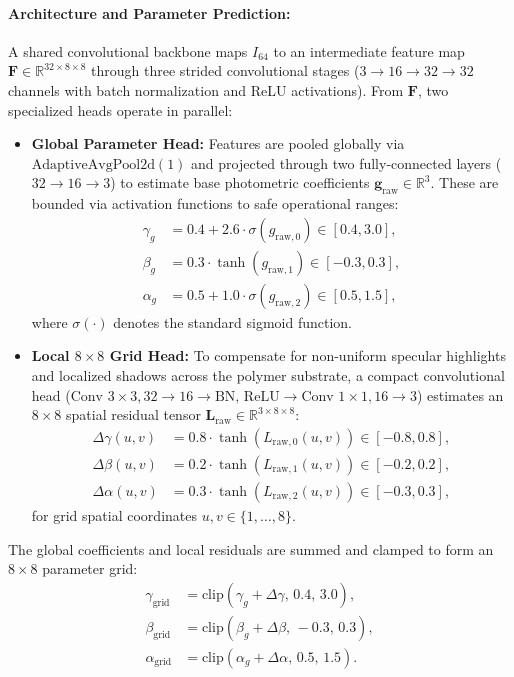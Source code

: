 \documentclass[final,5p,times,twocolumn,authoryear]{elsarticle}
\begin{document}
\paragraph{Architecture and Parameter Prediction:}
A shared convolutional backbone maps $I_{64}$ to an intermediate feature map $\mathbf{F} \in \mathbb{R}^{32 \times 8 \times 8}$ through three strided convolutional stages ($3 \to 16 \to 32 \to 32$ channels with batch normalization and ReLU activations). From $\mathbf{F}$, two specialized heads operate in parallel:
\begin{itemize}
    \item \textbf{Global Parameter Head:} Features are pooled globally via $\text{AdaptiveAvgPool2d}(1)$ and projected through two fully-connected layers ($32 \to 16 \to 3$) to estimate base photometric coefficients $\mathbf{g}_{\text{raw}} \in \mathbb{R}^3$. These are bounded via activation functions to safe operational ranges:
    \begin{align}
    \gamma_g &= 0.4 + 2.6 \cdot \sigma(g_{\text{raw}, 0}) \in [0.4, 3.0], \\
    \beta_g  &= 0.3 \cdot \tanh(g_{\text{raw}, 1}) \in [-0.3, 0.3], \\
    \alpha_g &= 0.5 + 1.0 \cdot \sigma(g_{\text{raw}, 2}) \in [0.5, 1.5],
    \end{align}
    where $\sigma(\cdot)$ denotes the standard sigmoid function.
    \item \textbf{Local $8 \times 8$ Grid Head:} To compensate for non-uniform specular highlights and localized shadows across the polymer substrate, a compact convolutional head ($\text{Conv } 3\times 3, 32 \to 16 \to \text{BN, ReLU} \to \text{Conv } 1\times 1, 16 \to 3$) estimates an $8 \times 8$ spatial residual tensor $\mathbf{L}_{\text{raw}} \in \mathbb{R}^{3 \times 8 \times 8}$:
    \begin{align}
    \Delta\gamma(u,v) &= 0.8 \cdot \tanh(L_{\text{raw}, 0}(u,v)) \in [-0.8, 0.8], \\
    \Delta\beta(u,v)  &= 0.2 \cdot \tanh(L_{\text{raw}, 1}(u,v)) \in [-0.2, 0.2], \\
    \Delta\alpha(u,v) &= 0.3 \cdot \tanh(L_{\text{raw}, 2}(u,v)) \in [-0.3, 0.3],
    \end{align}
    for grid spatial coordinates $u, v \in \{1, \dots, 8\}$.
\end{itemize}
The global coefficients and local residuals are summed and clamped to form an $8 \times 8$ parameter grid:
\begin{align}
\gamma_{\text{grid}} &= \text{clip}\left(\gamma_g + \Delta\gamma,\, 0.4,\, 3.0\right), \\
\beta_{\text{grid}}  &= \text{clip}\left(\beta_g + \Delta\beta,\, -0.3,\, 0.3\right), \\
\alpha_{\text{grid}} &= \text{clip}\left(\alpha_g + \Delta\alpha,\, 0.5,\, 1.5\right).
\end{align}
\end{document}
